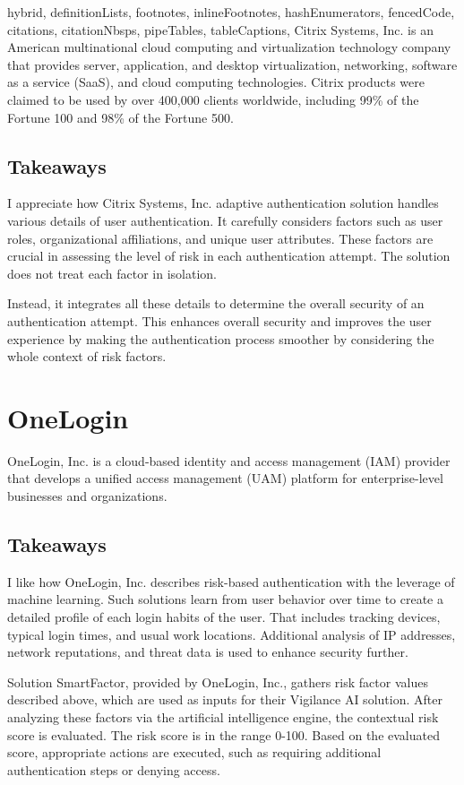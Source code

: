 \documentclass[
  digital,     %
  oneside,     %
  nosansbold,  %
  nocolorbold, %
  lof,         %
  lot,         %
]{fithesis4}
\begin{document}
\begin{markdown*}{%
  hybrid,
  definitionLists,
  footnotes,
  inlineFootnotes,
  hashEnumerators,
  fencedCode,
  citations,
  citationNbsps,
  pipeTables,
  tableCaptions,
}
Citrix Systems, Inc. is an American multinational cloud computing and virtualization technology company that provides server, application, and desktop virtualization, networking, software as a service (SaaS), and cloud computing technologies.
Citrix products were claimed to be used by over 400,000 clients worldwide, including 99\% of the Fortune 100 and 98\% of the Fortune 500.

\subsection{Takeaways}
I appreciate how Citrix Systems, Inc. adaptive authentication solution handles various details of user authentication.
It carefully considers factors such as user roles, organizational affiliations, and unique user attributes.
These factors are crucial in assessing the level of risk in each authentication attempt.
The solution does not treat each factor in isolation.\cite{existing-citrix-wiki} \cite{existing-citrix-blog}

Instead, it integrates all these details to determine the overall security of an authentication attempt.
This enhances overall security and improves the user experience by making the authentication process smoother by considering the whole context of risk factors. 


\newpage
\section{OneLogin}

OneLogin, Inc. is a cloud-based identity and access management (IAM) provider that develops a unified access management (UAM) platform for enterprise-level businesses and organizations. \cite{existing-onelogin}

\subsection{Takeaways}
I like how OneLogin, Inc. describes risk-based authentication with the leverage of machine learning. 
Such solutions learn from user behavior over time to create a detailed profile of each login habits of the user.
That includes tracking devices, typical login times, and usual work locations.
Additional analysis of IP addresses, network reputations, and threat data is used to enhance security further.

Solution SmartFactor, provided by OneLogin, Inc., gathers risk factor values described above, which are used as inputs for their Vigilance AI solution.
After analyzing these factors via the artificial intelligence engine, the contextual risk score is evaluated.
The risk score is in the range 0-100.
Based on the evaluated score, appropriate actions are executed, such as requiring additional authentication steps or denying access.\cite{existing-onelogin} 


\end{markdown*}
\end{document}
